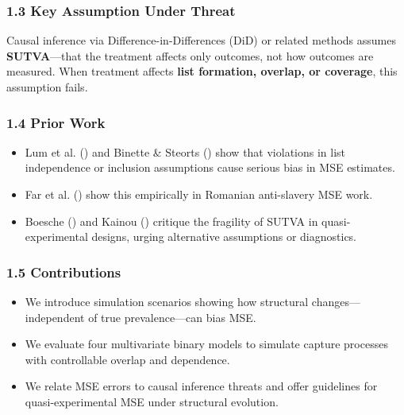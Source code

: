 \documentclass[
  12pt,
]{article}
\providecommand{\tightlist}{%
  \setlength{\itemsep}{0pt}\setlength{\parskip}{0pt}}\usepackage{longtable,booktabs,array}
\theoremstyle{plain}
\theoremstyle{definition}
\begin{document}
\subsubsection{\texorpdfstring{\textbf{1.3 Key Assumption Under
Threat}}{1.3 Key Assumption Under Threat}}\label{key-assumption-under-threat}

Causal inference via Difference-in-Differences (DiD) or related methods
assumes \textbf{SUTVA}---that the treatment affects only outcomes, not
how outcomes are measured. When treatment affects \textbf{list
formation, overlap, or coverage}, this assumption fails.

\subsubsection{\texorpdfstring{\textbf{1.4 Prior
Work}}{1.4 Prior Work}}\label{prior-work}

\begin{itemize}
\item
  Lum et al. () and Binette \&
  Steorts () show that violations
  in list independence or inclusion assumptions cause serious bias in
  MSE estimates.
\item
  Far et al. () show this empirically
  in Romanian anti-slavery MSE work.
\item
  Boesche () and Kainou
  () critique the fragility of SUTVA
  in quasi-experimental designs, urging alternative assumptions or
  diagnostics.
\end{itemize}

\subsubsection{\texorpdfstring{\textbf{1.5
Contributions}}{1.5 Contributions}}\label{contributions}

\begin{itemize}
\tightlist
\item
  We introduce simulation scenarios showing how structural
  changes---independent of true prevalence---can bias MSE.
\item
  We evaluate four multivariate binary models to simulate capture
  processes with controllable overlap and dependence.
\item
  We relate MSE errors to causal inference threats and offer guidelines
  for quasi-experimental MSE under structural evolution.
\end{itemize}
\end{document}
